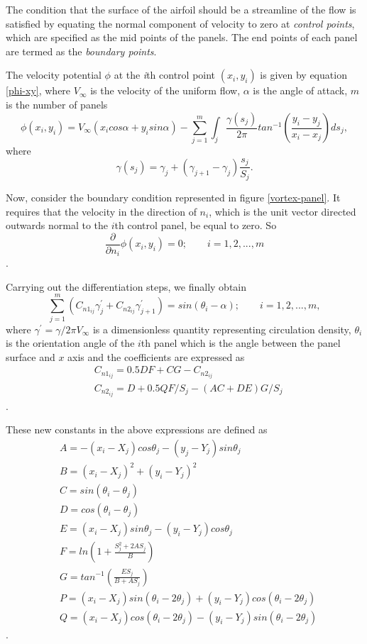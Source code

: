 \documentclass[letterpaper,12pt]{article}
\begin{document}
The condition that the surface of the airfoil should be a streamline of the flow is satisfied by equating the normal component of velocity to zero at \textit{control points}, which are specified as the mid points of the panels. The end points of each panel are termed as the \textit{boundary points}.

The velocity potential $\phi$ at the \textit{i}th control point $(x_{i}, y_{i})$ is given by equation \ref{phi-xy}, where $V_{\infty}$ is the velocity of the uniform flow, $\alpha$ is the angle of attack, $m$ is the number of panels
\begin{equation}
\phi(x_{i}, y_{i}) = V_{\infty}(x_{i}cos\alpha+y_{i}sin\alpha) - \sum_{j=1}^{m}\int_{j}\frac{\gamma(s_{j})}{2\pi}tan^{-1}\left(\frac{y_{i}-y_{j}}{x_{i}-x_{j}}\right)ds_{j},
\label{phi-xy}
\end{equation}
where
\begin{equation}
\gamma(s_j) = \gamma_j+(\gamma_{j+1}-\gamma_j)\frac{s_j}{S_j}.
\end{equation}

Now, consider the boundary condition represented in figure \ref{vortex-panel}. It requires that the velocity in the direction of $n_i$, which is the unit vector directed outwards normal to the $i$th control panel, be equal to zero. So
\[
\frac{\partial}{\partial n_i}\phi(x_i, y_i)=0;\qquad i = 1,2,...,m
\].

Carrying out the differentiation steps, we finally obtain
\begin{equation}
\sum_{j=1}^m(C_{n1_{ij}}\gamma_j^{'}+C_{n2_{ij}}\gamma_{j+1}^{'}) = sin(\theta_i-\alpha);\qquad i = 1,2,...,m,
\label{norm}
\end{equation}
where $\gamma^{'} = \gamma/2\pi V_\infty$ is a dimensionless quantity representing circulation density, $\theta_i$ is the orientation angle of the $i$th panel which is the angle between the panel surface and $x$ axis and the coefficients are expressed as
\begin{align*}
&C_{n1_{ij}} = 0.5DF + CG - C_{n2_{ij}}\\
&C_{n2_{ij}} = D + 0.5QF/S_j - (AC + DE) G/S_j
\end{align*}.

These new constants in the above expressions are defined as
\begin{align*}
&A = -(x_i-X_j)cos\theta_j - (y_j-Y_j)sin\theta_j\\
&B = (x_i-X_j)^2 + (y_i-Y_j)^2\\
&C = sin(\theta_i-\theta_j)\\
&D = cos(\theta_i-\theta_j)\\
&E = (x_i-X_j)sin\theta_j - (y_i-Y_j)cos\theta_j\\
&F = ln\left(1+\frac{S_j^2+2AS_j}{B}\right)\\
&G = tan^{-1}\left(\frac{ES_j}{B+AS_j}\right)\\
&P = (x_i-X_j)sin(\theta_i-2\theta_j)+(y_i-Y_j)cos(\theta_i-2\theta_j)\\
&Q = (x_i-X_j)cos(\theta_i-2\theta_j)-(y_i-Y_j)sin(\theta_i-2\theta_j)
\end{align*}.
\end{document}
